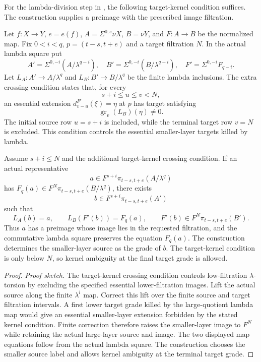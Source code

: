 \begin{theorem}
\label{sem:ProofTools:finite-lambda-division}
For the lambda-division step in \cite[Proposition 5.10]{LWX126},
the following target-kernel condition suffices. The construction supplies a preimage with the prescribed image filtration.

Let $f:X\to Y$, $e=e(f)$, $A=\Sigma^{0,e}\nu X$, $B=\nu Y$, and $F:A\to B$ be the normalized map. Fix $0<i<q$, $p=(t-s,t+e)$ and a target filtration $N$. In the actual lambda square put
\[
A'=\Sigma^{0,-i}(A/\lambda^{q-i}),\quad
B'=\Sigma^{0,-i}(B/\lambda^{q-i}),\quad
F'=\Sigma^{0,-i}F_{q-i}.
\]
Let $L_A:A'\to A/\lambda^q$ and $L_B:B'\to B/\lambda^q$ be the finite lambda inclusions. The extra crossing condition states that, for every
\[s+i\le u\le v<N,\]
an essential extension $d_{v-u}^{F'}(\xi)=\eta$ at $p$ has target satisfying
\[\operatorname{gr}_v(L_B)(\eta)\ne0.\]
The initial source row $u=s+i$ is included, while the terminal target row $v=N$ is excluded. This condition controls the essential smaller-layer targets killed by lambda.

Assume $s+i\le N$ and the additional target-kernel crossing condition. If an actual representative
\[a\in F^{s+i}\pi_{t-s,t+e}(A/\lambda^q)\]
has $F_q(a)\in F^N\pi_{t-s,t+e}(B/\lambda^q)$, there exists
\[b\in F^{s+i}\pi_{t-s,t+e}(A')\]
such that
\[L_A(b)=a,\qquad L_B(F'(b))=F_q(a),\qquad F'(b)\in F^N\pi_{t-s,t+e}(B').\]
Thus $a$ has a preimage whose image lies in the requested filtration,
and the commutative lambda square preserves the equation $F_q(a)$.
The construction determines the smaller-layer source as the grade of $b$. The target-kernel condition is only below $N$,
so kernel ambiguity at the final target grade is allowed.
\end{theorem}
\begin{proof}
\textit{Proof sketch.}
The target-kernel crossing condition controls low-filtration $\lambda$-torsion
by excluding the specified essential lower-filtration images.
Lift the actual source along the finite $\lambda^i$ map. Correct this lift over the finite source and target filtration intervals. A first lower target grade killed by the large-quotient lambda map would give an essential smaller-layer extension forbidden by the stated kernel condition. Finite correction therefore raises the smaller-layer image to $F^N$ while retaining the actual large-layer source and image. The two displayed map equations follow from the actual lambda square. The construction chooses the smaller source label and allows kernel ambiguity at the terminal target grade.
\end{proof}

